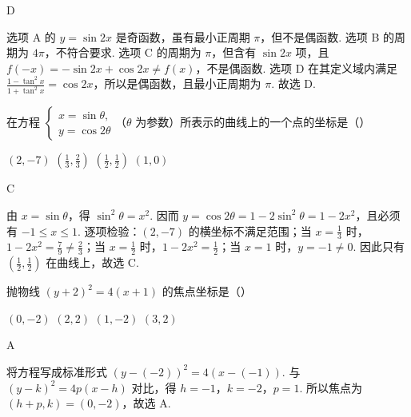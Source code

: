 \begin{answer}
D
\end{answer}

\begin{solution}
选项 A 的 \(y=\sin2x\) 是奇函数，虽有最小正周期 \(\pi\)，但不是偶函数. 选项 B 的周期为 \(4\pi\)，不符合要求. 选项 C 的周期为 \(\pi\)，但含有 \(\sin2x\) 项，且 \(f(-x)=-\sin2x+\cos2x\ne f(x)\)，不是偶函数. 选项 D 在其定义域内满足
\(\frac{1-\tan^2x}{1+\tan^2x}=\cos2x\)，所以是偶函数，且最小正周期为 \(\pi\). 故选 D.
\end{solution}

\begin{problem}
在方程 \(\begin{cases}
x = \sin \theta,\\
y = \cos 2\theta
\end{cases}\)（\(\theta\) 为参数）所表示的曲线上的一个点的坐标是（\quad）

\choices
    {\((2,-7)\)}
    {\(\left(\frac{1}{3}, \frac{2}{3}\right)\)}
    {\(\left(\frac{1}{2}, \frac{1}{2}\right)\)}
    {\((1,0)\)}
\end{problem}

\begin{answer}
C
\end{answer}

\begin{solution}
由 \(x=\sin\theta\)，得 \(\sin^2\theta=x^2\). 因而 \(y=\cos2\theta=1-2\sin^2\theta=1-2x^2\)，且必须有 \(-1\leqslant x\leqslant1\). 逐项检验：\((2,-7)\) 的横坐标不满足范围；当 \(x=\frac{1}{3}\) 时，\(1-2x^2=\frac{7}{9}\ne\frac{2}{3}\)；当 \(x=\frac{1}{2}\) 时，\(1-2x^2=\frac{1}{2}\)；当 \(x=1\) 时，\(y=-1\ne0\). 因此只有 \(\left(\frac{1}{2},\frac{1}{2}\right)\) 在曲线上，故选 C.
\end{solution}

\begin{problem}
抛物线 \((y + 2)^2 = 4(x + 1)\) 的焦点坐标是（\quad）

\choices
    {\((0,-2)\)}
    {\((2,2)\)}
    {\((1,-2)\)}
    {\((3,2)\)}
\end{problem}

\begin{answer}
A
\end{answer}

\begin{solution}
将方程写成标准形式 \(\left(y-(-2)\right)^2=4\left(x-(-1)\right)\). 与 \((y-k)^2=4p(x-h)\) 对比，得 \(h=-1\)，\(k=-2\)，\(p=1\). 所以焦点为 \((h+p,k)=(0,-2)\)，故选 A.
\end{solution}

